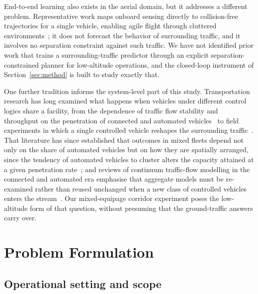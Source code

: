 \documentclass[11pt]{article}
\theoremstyle{plain}
\theoremstyle{definition}
\begin{document}
End-to-end learning also exists in the aerial domain, but it
addresses a different problem. Representative work maps onboard
sensing directly to collision-free trajectories for a single vehicle,
enabling agile flight through cluttered
environments~\citep{loquercio2021learning}; it does not forecast the
behavior of surrounding traffic, and it involves no separation
constraint against such traffic. We have not identified prior work
that trains a surrounding-traffic predictor through an explicit
separation-constrained planner for low-altitude operations, and the
closed-loop instrument of Section~\ref{sec:method} is built to study
exactly that.

One further tradition informs the system-level part of this study. Transportation research has long examined what happens when vehicles under different control logics share a facility, from the dependence of traffic flow stability and throughput on the penetration of connected and automated vehicles~\citep{talebpour2016influence} to field experiments in which a single controlled vehicle reshapes the surrounding
traffic~\citep{stern2018dissipation}. That literature has since
established that outcomes in mixed fleets depend not only on the share
of automated vehicles but on how they are spatially arranged, since
the tendency of automated vehicles to cluster alters the capacity
attained at a given penetration rate~\citep{zhao2024clustering}; and
reviews of continuum traffic-flow modelling in the connected and
automated era emphasise that aggregate models must be re-examined
rather than reused unchanged when a new class of controlled vehicles
enters the stream~\citep{mohammadian2023continuum}. Our mixed-equipage
corridor experiment poses the low-altitude form of that question,
without presuming that the ground-traffic answers carry over.

\section{Problem Formulation}
\label{sec:problem}
 
\subsection{Operational setting and scope}
\label{sec:problem-setting}
 
\end{document}

